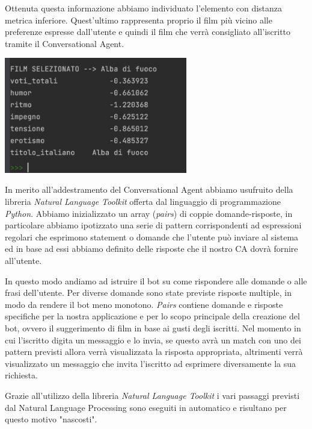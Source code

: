 \documentclass[a4paper, 10pt]{report}
\begin{document}
        Ottenuta questa informazione abbiamo individuato l'elemento con distanza metrica inferiore. Quest'ultimo rappresenta proprio
        il film più vicino alle preferenze espresse dall'utente e quindi il film che verrà consigliato all'iscritto tramite il
        Conversational Agent.
        \begin{center}
            \includegraphics[width=8cm]{modelling/filmSelezionato}\\
        \end{center}

        In merito all'addestramento del Conversational Agent abbiamo usufruito della libreria \textit{Natural Language Toolkit}
        offerta dal linguaggio di programmazione \textit{Python}. Abbiamo inizializzato un array (\textit{pairs}) di coppie domande-risposte,
        in particolare abbiamo ipotizzato una serie di pattern corrispondenti ad espressioni regolari che esprimono statement o domande che
        l'utente può inviare al sistema ed in base ad essi abbiamo definito delle risposte che il nostro CA dovrà fornire all'utente.

        In questo modo andiamo ad istruire il bot su come rispondere alle domande o alle frasi dell'utente. Per diverse domande
        sono state previste risposte multiple, in modo da rendere il bot meno monotono.
        \textit{Pairs} contiene domande e risposte specifiche per la nostra applicazione e per lo scopo
        principale della creazione del bot, ovvero il suggerimento di film in base ai gusti degli iscritti.
        Nel momento in cui l'iscritto digita un messaggio e lo invia, se questo avrà un match con uno dei pattern previsti allora
        verrà visualizzata la risposta appropriata, altrimenti verrà visualizzato un messaggio che invita l'iscritto
        ad esprimere diversamente la sua richiesta.

        Grazie all'utilizzo della libreria \textit{Natural Language Toolkit} i vari passaggi previsti dal Natural Language Processing
        sono eseguiti in automatico e risultano per questo motivo "nascosti".
\end{document}
